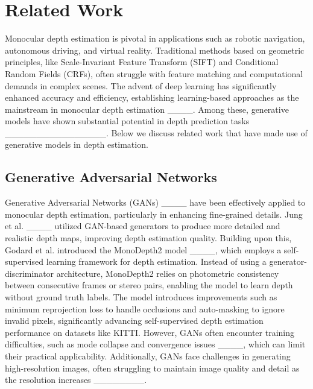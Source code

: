 \section{Related Work}
Monocular depth estimation is pivotal in applications such as robotic navigation, autonomous driving, and virtual reality. Traditional methods based on geometric principles, like Scale-Invariant Feature Transform (SIFT) and Conditional Random Fields (CRFs), often struggle with feature matching and computational demands in complex scenes. The advent of deep learning has significantly enhanced accuracy and efficiency, establishing learning-based approaches as the mainstream in monocular depth estimation ____. Among these, generative models have shown substantial potential in depth prediction tasks ________________. Below we discuss related work that have made use of generative models in depth estimation. 

\subsection{Generative Adversarial Networks}
Generative Adversarial Networks (GANs) ____ have been effectively applied to monocular depth estimation, particularly in enhancing fine-grained details. Jung et al. ____ utilized GAN-based generators to produce more detailed and realistic depth maps, improving depth estimation quality. Building upon this, Godard et al. introduced the MonoDepth2 model ____, which employs a self-supervised learning framework for depth estimation. Instead of using a generator-discriminator architecture, MonoDepth2 relies on photometric consistency between consecutive frames or stereo pairs, enabling the model to learn depth without ground truth labels. The model introduces improvements such as minimum reprojection loss to handle occlusions and auto-masking to ignore invalid pixels, significantly advancing self-supervised depth estimation performance on datasets like KITTI. However, GANs often encounter training difficulties, such as mode collapse and convergence issues ____, which can limit their practical applicability. Additionally, GANs face challenges in generating high-resolution images, often struggling to maintain image quality and detail as the resolution increases ________.

